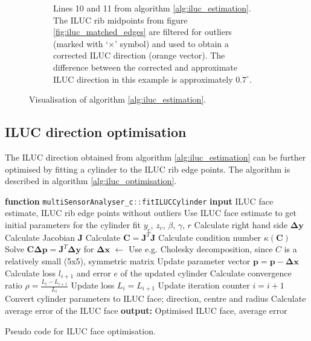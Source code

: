 \begin{figure}[H]
\begin{subfigure}[c]{0.45\textwidth}
        \caption{Lines 10 and 11 from algorithm \ref{alg:iluc_estimation}. The ILUC rib midpoints from figure \ref{fig:iluc_matched_edges} are filtered for outliers (marked with `$\times$' symbol) and used to obtain a corrected ILUC direction (orange vector). The difference between the corrected and approximate ILUC direction in this example is approximately $0.7^{\circ}$.}
        \label{fig:iluc_corrected_direction}
    \end{subfigure}
    \caption{Visualisation of algorithm \ref{alg:iluc_estimation}.}
    \label{fig:iluc_estimation}
\end{figure}

\subsection{ILUC direction optimisation}
The ILUC direction obtained from algorithm \ref{alg:iluc_estimation} can be further optimised by fitting a cylinder to the ILUC rib edge points. The algorithm is described in algorithm \ref{alg:iluc_optimisation}.
\begin{algorithm}[H]
    \begin{algorithmic}[1]
        \State \textbf{function} \lstinline[language=C]|multiSensorAnalyser_c::fitILUCCylinder|
        \State \textbf{input} ILUC face estimate, ILUC rib edge points without outliers
        \State Use ILUC face estimate to get initial parameters for the cylinder fit $y_c$, $z_c$, $\beta$, $\gamma$, $r$
        \State Calculate right hand side $\mathbf{\Delta y}$
        \State Calculate Jacobian $\mathbf{J}$
        \State Calculate $\mathbf{C} = \mathbf{J}^T \mathbf{J}$
        \State Calculate condition number $\kappa(\mathbf{C})$
        \State Solve $\mathbf{C} \mathbf{\Delta p} = \mathbf{J}^T \mathbf{\Delta y}$ for $\mathbf{\Delta x}$ $\leftarrow$ Use e.g. Cholesky decomposition, since $C$ is a relatively small (5x5), symmetric matrix
        \State Update parameter vector $\mathbf{p} = \mathbf{p} - \mathbf{\Delta x}$
        \State Calculate loss $l_{i+1}$ and error $e$ of the updated cylinder
        \State Calculate convergence ratio $\rho = \frac{L_i - L_{i+1}}{L_i}$
        \State Update loss $L_i = L_{i+1}$
        \State Update iteration counter $i = i + 1$
        \EndWhile
        \State Convert cylinder parameters to ILUC face; direction, centre and radius
        \State Calculate average error of the ILUC face
        \State \textbf{output: } Optimised ILUC face, average error
    \end{algorithmic}
    \caption{Pseudo code for ILUC face optimisation.}
    \label{alg:iluc_optimisation}
\end{algorithm}
